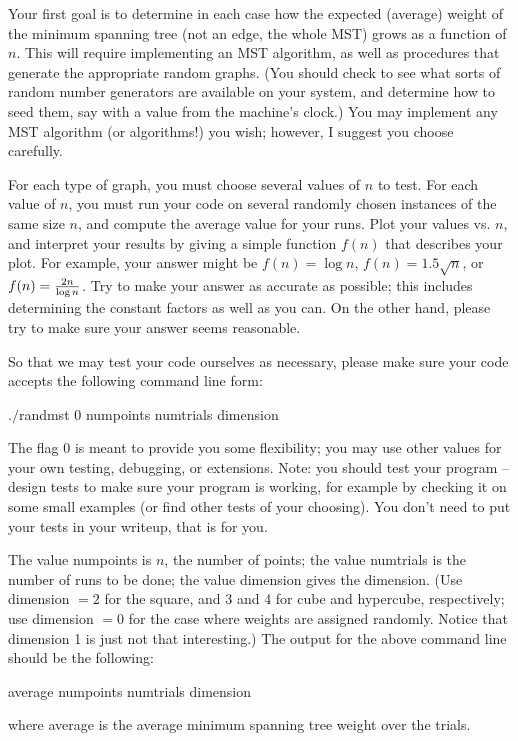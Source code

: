 \documentclass[11pt]{article}
\begin{document}
Your first goal is to determine in each case how the expected
(average) weight of the minimum spanning tree (not an edge, the whole MST) grows as a function of
$n$.  This will require implementing an MST algorithm, as well as
procedures that generate the appropriate random graphs.  (You should
check to see what sorts of random number generators are available on
your system, and determine how to seed them, say with a value from the
machine's clock.)  You may implement any MST algorithm (or algorithms!) you wish; however,
I suggest you choose carefully.  

For each type of graph, you must choose several values of $n$ to test.
For each value of $n$, you must run your code on several randomly
chosen instances of the same size $n$, and compute the average value
for your runs.  Plot your values vs. $n$, and interpret your results
by giving a simple function $f(n)$ that describes your plot.  For
example, your answer might be $f(n) = \log n$, $f(n) = 1.5\sqrt{n}$,
or $f(n) = {2n \over \log n}$.  Try to make your answer as accurate as
possible; this includes determining the constant factors as well as
you can.  On the other hand, please try to make sure your answer seems
reasonable.


So that we may test your code ourselves as necessary, please make sure
your code accepts the following command line form:

\noindent $./$randmst 0 numpoints numtrials dimension

The flag 0 is meant to provide you some flexibility; you may use other
values for your own testing, debugging, or extensions.  
Note:  you should test your program -- design tests to make sure your
program is working, for example by checking it on some small examples
(or find other tests of your choosing).  You don't need to put your
tests in your writeup, that is for you.  

The value
numpoints is $n$, the number of points; the value numtrials is the
number of runs to be done; the value dimension gives the dimension.
(Use dimension $= 2$ for the square, and 3 and 4 for cube and hypercube, respectively;
use dimension $= 0$ for the case where weights are assigned randomly.
Notice that dimension 1 is just not that interesting.)
The output for the above command line should be the following:

\noindent average numpoints numtrials dimension

where average is the average minimum spanning tree weight over the
trials.  
\end{document}
